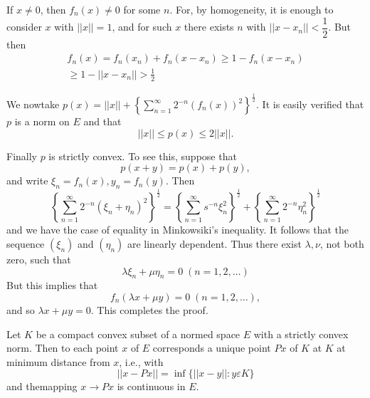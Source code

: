 If $x\neq 0$, then $f_n (x) \neq 0$ for some $n$. For, by
homogeneity, it is enough to consider $x$ with $||x|| =1$, and for such
$x$ there exists $n$ with $|| x - x_n || < \dfrac{1}{2}$. But then 
\begin{gather*}
  f_n (x) = f_n (x_n) + f_n (x-x_n) \geq 1-f_n (x-x_n)\\
  \geq 1- || x-x_n|| > \frac{1}{2}
\end{gather*}

We now\pageoriginale take $p(x) = || x || + \left\{
\sum\limits_{n=1}^{\infty} 
2^{-n} (f_n (x))^2 \right\}^{\frac{1}{2}}$. It is easily verified
that $p$ is a norm on $E$ and that 
$$
||x|| \leq p (x) \leq 2 || x||.
$$

Finally $p$ is strictly convex. To see this, suppose that 
$$
p (x + y) = p(x) + p(y),
$$
and write $\xi _n = f_n (x), y_n = f_n (y)$. Then
$$
\left\{\sum_{n=1}^{\infty} 2^{-n} (\xi_n + \eta_n)^2 \right\}
^{\frac{1}{2}}= \left\{\sum_{n=1}^{\infty} s^{-n} \xi ^2_n \right\}
^{\frac{1}{2}}+\left\{\sum_{n=1}^{\infty} 2^{-n} \eta^2_n \right\}^{\frac{1}{2}} 
$$
and we have the case of equality in Minkowsiki's inequality. It
follows that the sequence $(\xi_n)$ and $(\eta_n)$ are linearly
dependent. Thus there exist $\lambda, \nu$, not both zero, such that 
$$
\lambda \xi _{n}+ \mu \eta _n = 0 \; (n=1, 2, \ldots)  
$$
But this implies that 
$$
f_n (\lambda x + \mu y) = 0 \; (n=1, 2, \ldots),
$$
and so $\lambda x + \mu y = 0$. This completes the proof.

\setcounter{section}{2}
\begin{lemma}\label{chap2:lem2.1}%
  Let $K$ be a compact convex subset of a normed space $E$ with a
  strictly convex norm. Then to each point $x$ of $E$ corresponds a
  unique point $Px$ of $K$ at $K$ at minimum distance from $x$,
  i.e., with 
  $$
  || x - Px || = \inf \{ || x-y || : y \varepsilon K \}
  $$ 
  and the\pageoriginale mapping $x \to Px$ is continuous in $E$.
\end{lemma}

